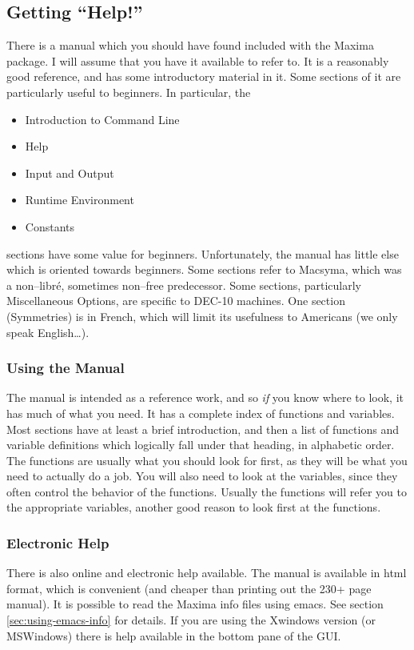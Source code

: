 \documentclass[titlepage]{article}
\begin{document}
\subsection{Getting ``Help!''}

There is a manual which you  should have found included with the Maxima
package.  I will assume that you have it available to refer to.  It is a
reasonably good reference, and has some introductory material in it.
Some  sections of it are particularly useful to beginners.  In
particular, the
\begin{itemize}
\item Introduction to Command Line
\item Help
\item Input and Output
\item Runtime Environment
\item Constants
\end{itemize}
sections have some value for beginners.  Unfortunately, the manual has
little else which is oriented towards beginners. Some sections refer to
Macsyma, which was a non--libr\'e, sometimes non--free predecessor.
Some sections, particularly Miscellaneous Options, are specific to
DEC-10 machines.  One section (Symmetries) is  in French, which will
limit its usefulness to Americans (we only speak English\dots).

\subsubsection{Using the Manual}

The manual is intended as a reference work, and so \emph{if} you know
where to look, it has much of what you need.  It has a  complete index
of functions and variables.  Most sections have at least a brief
introduction, and then a list of functions and variable definitions
which logically fall under that heading, in alphabetic order.  The
functions are usually what you should look for first, as they will be
what you need to actually do a job.  You will also need to look at the
variables, since they often control the behavior of the functions.
Usually the functions will refer you to the appropriate variables,
another good reason to look first at the functions.

\subsubsection{Electronic Help}  There is also online and electronic
help available.  The manual is available in html format, which is
convenient (and cheaper than printing out the 230+ page manual). It is
possible to read the Maxima info files using emacs.  See section
\vref{sec:using-emacs-info} for details.  If you are using the Xwindows
version (or MSWindows) there is help available in the bottom pane of the
GUI.
\end{document}
